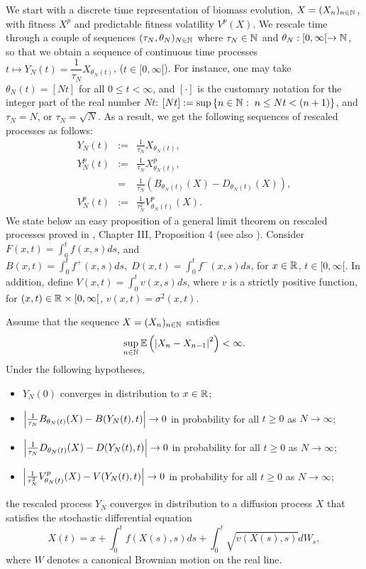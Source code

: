 \documentclass[12pt]{article}
\begin{document}
We start with a discrete time representation of biomass evolution, $X=({X}_{n})_{n\in {\mathbb{N}}^{}}$, with fitness $X^p$ and predictable fitness volatility $V^p(X)$. We rescale time through a couple of sequences $(\tau_N,\theta_N)_{N\in{\mathbb{N}}^{}}$ where $\tau_N\in{\mathbb{N}}^{}$ and $\theta_N:[0,\infty[\to{\mathbb{N}}^{}$, so that we obtain a sequence of continuous time processes $t\mapsto Y_N(t)=\dfrac{1}{\tau_N}X_{\theta_N(t)}$, ($t\in [0,\infty[$). For instance, one may take $\theta_N(t)=[Nt]$ for all $0\leq t<\infty$, and $[\cdot]$ is the customary notation for the integer part of the real number $Nt$: $[Nt]:=\sup\left\{n\in{\mathbb{N}}^{}:\;n\leq Nt<(n+1)\right\}$, and $\tau_N=N$, or $\tau_N=\sqrt{N}$. As a result, we get the following sequences of rescaled processes as follows:
\begin{eqnarray}
    Y_N(t)&:=&\frac{1}{\tau_N}X_{\theta_N(t)},\\
    Y^p_N(t)&:=&\frac{1}{\tau_N}X^p_{\theta_N(t)},\\
    &=&\frac{1}{\tau_N}\left(B_{\theta_N(t)}(X)-D_{\theta_N(t)}(X)\right)\nonumber,\\
    V^p_N(t)&:=&\frac{1}{\tau_N^2}V^p_{\theta_N(t)} (X).
\end{eqnarray}
We state below an easy proposition of a general limit theorem on rescaled processes proved in \cite{Rebolledo:1979vk}, Chapter III, Proposition 4 (see also \cite{Platen:1985vl}).
Consider $F(x,t)=\int_0^tf(x,s)ds$, and $B(x,t)=\int_0^tf^+(x,s)ds,\;D(x,t)=\int_0^tf^-(x,s)ds$, for $x\in{\mathbb R}^{}$, $t\in [0,\infty[$. In addition, define $V(x,t)=\int_0^t v(x,s)ds$, where $v$ is a strictly positive function, for $(x,t)\in{\mathbb R}^{}\times [0,\infty[$, $v(x,t)=\sigma^2(x,t)$.
\begin{prop}
    Assume that the sequence $X=({X}_{n})_{n\in {\mathbb{N}}^{}}$ satisfies
    \begin{equation}
       \sup_{n\in{\mathbb{N}}^{}} \mathbb{E}\left(\left\vert X_n-X_{n-1}\right\vert^2\right)<\infty.
    \end{equation}
  Under the following hypotheses,
    \begin{itemize}
    \item[(H0)] $Y_N(0)$ converges in distribution to $x\in{\mathbb R}^{}$;
\item [(H1)] $\left\vert\frac{1}{\tau_N}B_{\theta_N(t)}(X)-B(Y_N(t),t)\right\vert\to 0$ in probability for all $t\geq 0$ as $N\to\infty$;
\item [(H2)] $\left\vert\frac{1}{\tau_N}D_{\theta_N(t)}(X)-D(Y_N(t),t)\right\vert\to 0$ in probability for all $t\geq 0$ as $N\to\infty$;
\item [(H3)] $\left\vert\frac{1}{\tau_N^2}V^p_{\theta_N(t)}(X)-V(Y_N(t),t)\right\vert\to 0$ in probability for all $t\geq 0$ as $N\to\infty$;
    \end{itemize}
    the rescaled process $Y_N$ converges in distribution to a diffusion process $X$ that satisfies the stochastic differential equation
    \begin{equation}\label{limit-diff}
        X(t)=x+\int_0^tf(X(s),s)ds+\int_0^t\sqrt{v(X(s),s)}dW_s,
    \end{equation}
    where $W$ denotes a canonical Brownian motion on the real line.
\end{prop}
\end{document}
